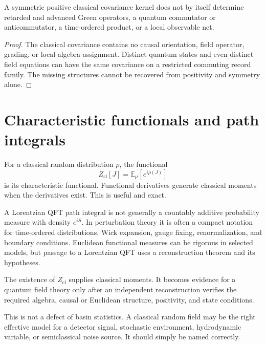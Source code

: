 \documentclass[11pt]{article}
\newcommand{\E}{\mathbb E}
\begin{document}
\begin{proposition}
A symmetric positive classical covariance kernel does not by itself
determine retarded and advanced Green operators, a quantum commutator or
anticommutator, a time-ordered product, or a local observable net.
\end{proposition}

\begin{proof}
The classical covariance contains no causal orientation, field operator,
grading, or local-algebra assignment.  Distinct quantum states and even
distinct field equations can have the same covariance on a restricted
commuting record family.  The missing structures cannot be recovered from
positivity and symmetry alone.
\end{proof}

\section{Characteristic functionals and path integrals}

For a classical random distribution \(\rho\), the functional
\[
 Z_{\mathrm{cl}}[J]
 =\E_\mu\!\left[e^{i\rho(J)}\right]
\]
is its characteristic functional.  Functional derivatives generate
classical moments when the derivatives exist.  This is useful and exact.

A Lorentzian QFT path integral is not generally a countably additive
probability measure with density \(e^{iS}\).  In perturbation theory it is
often a compact notation for time-ordered distributions, Wick expansion,
gauge fixing, renormalization, and boundary conditions.  Euclidean
functional measures can be rigorous in selected models, but passage to a
Lorentzian QFT uses a reconstruction theorem and its hypotheses.

\begin{proposition}
The existence of \(Z_{\mathrm{cl}}\) supplies classical moments.  It
becomes evidence for a quantum field theory only after an independent
reconstruction verifies the required algebra, causal or Euclidean
structure, positivity, and state conditions.
\end{proposition}

This is not a defect of basin statistics.  A classical random field may be
the right effective model for a detector signal, stochastic environment,
hydrodynamic variable, or semiclassical noise source.  It should simply be
named correctly.
\end{document}
